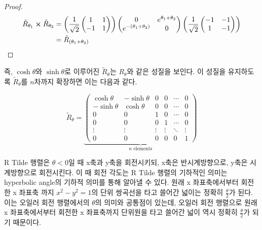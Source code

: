 \documentclass{thesis-SJ}
\begin{document}
\begin{enumerate}
\begin{proof}
	\begin{align*}
	\tilde{R}_{\theta_1}\cross \tilde{R}_{\theta_2} &= \left(\frac{1}{\sqrt{2}}\begin{pmatrix}
	1 & 1 \\ -1 & 1
	\end{pmatrix}\right) \begin{pmatrix}
	0 & e^{\theta_1+\theta_2} \\ e^{-({\theta_1+\theta_2})} & 0
	\end{pmatrix} \left(\frac{1}{\sqrt{2}}\begin{pmatrix}
	-1 & -1 \\ 1 & -1
	\end{pmatrix}\right) \\
	&= \tilde{R}_{(\theta_1+\theta_2)}
	\end{align*}
	
	
\end{proof}

\end{enumerate}

즉, $\cosh \theta$와 $\sinh \theta$로 이루어진 $\tilde{R}_\theta$는 $R_\theta$와 같은 성질을 보인다. 이 성질을 유지하도록 $\tilde{R}_\theta$를 $n$차까지 확장하면 이는 다음과 같다.

\begin{equation}
\tilde{R}_\theta = \underbrace{\begin{pmatrix}
	\cosh \theta & -\sinh \theta & 0 & 0 & \cdots & 0\\
	-\sinh \theta & \cosh \theta & 0 & 0 & \cdots & 0\\
	0 & 0 & 1 & 0 & \cdots & 0 \\
	0 & 0 & 0 & 1 & \cdots & 0 \\
	\vdots & \vdots & \vdots & \vdots & \ddots & \vdots \\
	0 & 0 & 0 & 0& 0 & 1
	\end{pmatrix}}_{n \text{ elements}}
\end{equation}

 R Tilde 행렬은 $\theta<0$일 때 x축과 y축을 회전시키되, x축은 반시계방향으로, y축은 시계방향으로 회전시킨다. 이 때 회전 각도는 R Tilde 행렬의 기하적인 의미는 hyperbolic angle의 기하적 의미를 통해 알아낼 수 있다. 원래 x 좌표축에서부터 회전한 x 좌표축 까지 $x^2-y^2=1$의 단위 쌍곡선을 타고 쓸어간 넓이는 정확히 $\frac{\theta}{2}$가 된다. 이는 오일러 회전 행렬에서의 $\theta$의 의미와 공통점이 있는데, 오일러 회전 행렬으로 원래 x 좌표축에서부터 회전한 x 좌표축까지 단위원을 타고 쓸어간 넓이 역시 정확히 $\frac{\theta}{2}$가 되기 때문이다.
 
\end{document}
